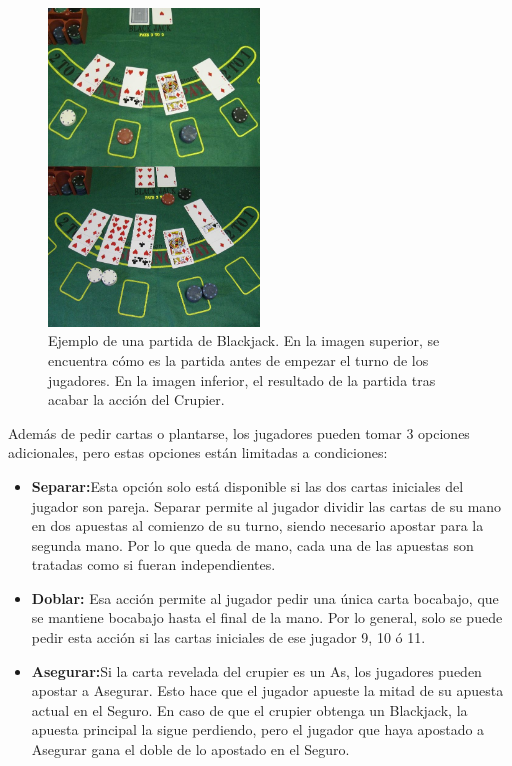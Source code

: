 \begin{figure}[tb]
\centering
\includegraphics[width=0.5\textwidth]{figuras/blackjack.jpg}   
\caption{Ejemplo de una partida de Blackjack. En la imagen superior, se encuentra cómo es la partida antes de empezar el turno de los jugadores. En la imagen inferior, el resultado de la partida tras acabar la acción del Crupier.\cite{mesa}}
\label{fig:black}
\end{figure}


Además de pedir cartas o plantarse, los jugadores pueden tomar 3 opciones adicionales, pero estas opciones están limitadas a condiciones:
\begin{itemize}
\item \textbf{Separar:}Esta opción solo está disponible si las dos cartas iniciales del jugador son pareja. Separar permite al jugador dividir las cartas de su mano en dos apuestas al comienzo de su turno, siendo necesario apostar para la segunda mano. Por lo que queda de mano, cada una de las apuestas son tratadas como si fueran independientes.
\item \textbf{Doblar:} Esa acción permite al jugador pedir una única carta bocabajo, que se mantiene bocabajo hasta el final de la mano. Por lo general, solo se puede pedir esta acción si las cartas iniciales de ese jugador 9, 10 ó 11. 
\item \textbf{Asegurar:}Si la carta revelada del crupier es un As, los jugadores pueden apostar a Asegurar. Esto hace que el jugador apueste la mitad de su apuesta actual en el Seguro. En caso de que el crupier obtenga un Blackjack, la apuesta principal la sigue perdiendo, pero el jugador que haya apostado a Asegurar gana el doble de lo apostado en el Seguro.
\end{itemize} 

